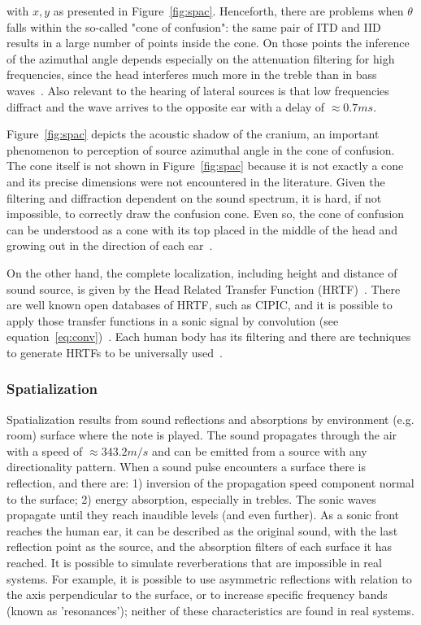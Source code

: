 \noindent with $x,y$ as presented in Figure~\ref{fig:spac}. Henceforth, there are problems when $\theta$ falls within the so-called "cone of confusion": the same pair of ITD and IID results in a large number of points inside the cone. On those points the inference of the azimuthal angle depends especially on the attenuation filtering for high frequencies, since the head interferes much more in the treble than in bass waves~\cite{Heeger,hrtf}. Also relevant to the hearing of lateral sources is that low frequencies diffract and the wave arrives to the opposite ear with a delay of $\approx 0.7ms$.\cite{floEsp}

Figure~\ref{fig:spac} depicts the acoustic shadow of the cranium, an important phenomenon to perception of source azimuthal angle in the cone of confusion. The cone itself is not shown in Figure~\ref{fig:spac} because it is not exactly a cone and its precise dimensions were not encountered in the literature. Given the filtering and diffraction dependent on the sound spectrum, it is hard, if not impossible, to correctly draw the confusion cone. Even so, the cone of confusion can be understood as a cone with its top placed in the middle of the head and growing out in the direction of each ear~\cite{hrtf}.

On the other hand, the complete localization, including height and distance of sound source, is given by the Head Related Transfer Function (HRTF)~\cite{hrtf}. There are well known open databases of HRTF, such as CIPIC, and it is possible to apply those transfer functions in a sonic signal by convolution (see equation~\ref{eq:conv})~\cite{CIPIC}. Each human body has its filtering and there are techniques to generate HRTFs to be universally used~\cite{lazaSPA}. 

\subsubsection{Spatialization}

Spatialization results from sound reflections and absorptions by environment (e.g. room) surface where the note is played. The sound propagates through the air with a speed of $\approx 343.2m/s$ and can be emitted from a source with any directionality pattern. When a sound pulse encounters a surface there is reflection, and there are: 1) inversion of the propagation speed component normal to the surface;  2) energy absorption, especially in trebles. The sonic waves propagate until they reach inaudible levels (and even further). As a sonic front reaches the human ear, it can be described as the original sound, with the last reflection point as the source, and the absorption filters of each surface it has reached. It is possible to simulate reverberations that are impossible in real systems. For example, it is possible to use asymmetric reflections with relation to the axis perpendicular to the surface, or to increase specific frequency bands (known as 'resonances'); neither of these characteristics are found in real systems.

